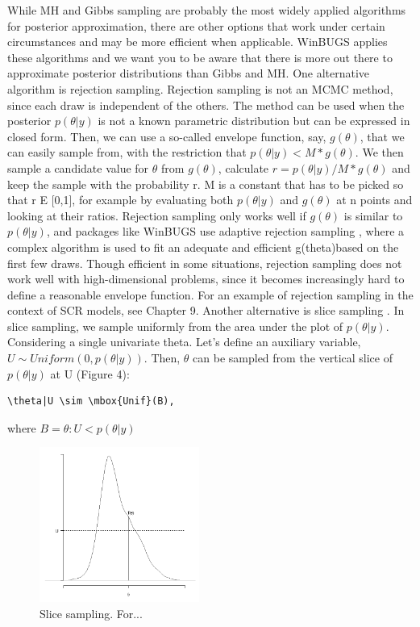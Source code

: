 While MH and Gibbs sampling are probably the most widely applied algorithms for posterior approximation, there are other options that work under certain circumstances and may be more efficient when applicable. WinBUGS applies these algorithms and we want you to be aware that there is more out there to approximate posterior distributions than Gibbs and MH. 
One alternative algorithm is rejection sampling. Rejection sampling is not an MCMC method, since each draw is independent of the others. The method can be used when the posterior $p(\theta|y)$ is not a known parametric distribution but can be expressed in closed form. Then, we can use a so-called envelope function, say, $g(\theta)$, that we can easily sample from, with the restriction that $p(\theta|y) < M * g(\theta)$. We then sample a candidate value for $\theta$ from $g(\theta)$, calculate $r = p(\theta|y)/M*g(\theta)$ and keep the sample with the probability r. M is a constant that has to be picked so that r E [0,1], for example by evaluating both $p(\theta|y)$ and $g(\theta)$ at n points and looking at their ratios. Rejection sampling only works well if $g(\theta)$ is similar to $p(\theta|y)$, and packages like WinBUGS use adaptive rejection sampling \citep{gilks_wild:1992}, where a complex algorithm is used to fit an adequate and efficient g(theta)based on the first few draws. Though efficient in some situations, rejection sampling does not work well with high-dimensional problems, since it becomes increasingly hard to define a reasonable envelope function. For an example of rejection sampling in the context of SCR models, see Chapter 9. 
Another alternative is slice sampling \citep{neal:2003}. In slice sampling, we sample uniformly from the area under the plot of $p(\theta|y)$. Considering a single univariate theta. Let's define an auxiliary variable, $U \sim  Uniform(0, p(\theta|y))$. Then, $\theta$ can be sampled from the vertical slice of $p(\theta|y)$ at U (Figure 4):

\begin{verbatim}
\theta|U \sim \mbox{Unif}(B),
\end{verbatim}
where $B = {\theta: U < p(\theta|y)}$


\begin{figure}
\begin{center}
\includegraphics[height=2in]{figs/slicesampling}
\end{center}
\caption{Slice sampling. For...} 
\label{slicesample.fig}
\end{figure}

